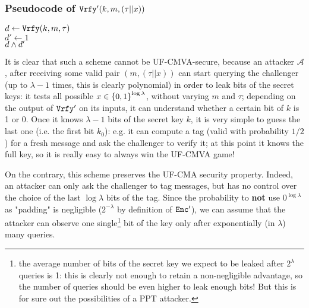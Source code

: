 \begin{enumerate}[(a)]
\begin{enumerate}[(i)]
\begin{solution}
			            \subsubsection*{Pseudocode of $\texttt{Vrfy}'(k,m, (\tau || x))$}
			            \begin{algorithm}[H]
				            $d \leftarrow \texttt{Vrfy}(k, m, \tau)$ \\
				            $d' \leftarrow 1$ \\
				            \Return $d \wedge d'$
			            \end{algorithm}

			            It is clear that such a scheme cannot be UF-CMVA-secure, because an attacker $\mathcal{A}$, after receiving some valid pair $(m, (\tau || x))$ can start querying the challenger (up to $\lambda - 1$ times, this is clearly polynomial) in order to leak bits of the secret keys: it tests all possible $x \in {\{0, 1\}}^{\log \lambda}$, without varying $m$ and $\tau$; depending on the output of $\texttt{Vrfy}'$ on its inputs, it can understand whether a certain bit of $k$ is 1 or 0. Once it knows $\lambda - 1$ bits of the secret key $k$, it is very simple to guess the last one (i.e. the first bit $k_0$): e.g. it can compute a tag (valid with probability $1/2$) for a fresh message and ask the challenger to verify it; at this point it knows the full key, so it is really easy to always win the UF-CMVA game!

			            On the contrary, this scheme preserves the UF-CMA security property. Indeed, an attacker can only ask the challenger to tag messages, but has no control over the choice of the last $\log \lambda$ bits of the tag. Since the probability to \textbf{not} use $0^{\log \lambda}$ as "padding" is negligible ($2^{-\lambda}$ by definition of $\texttt{Enc}'$), we can assume that the attacker can observe one single\footnote{the average number of bits of the secret key we expect to be leaked after $2^\lambda$ queries is 1: this is clearly not enough to retain a non-negligible advantage, so the number of queries should be even higher to leak enough bits! But this is for sure out the possibilities of a PPT attacker.} bit of the key only after exponentially (in $\lambda$) many queries.
		            \end{solution}
	      \end{enumerate}
\end{enumerate}